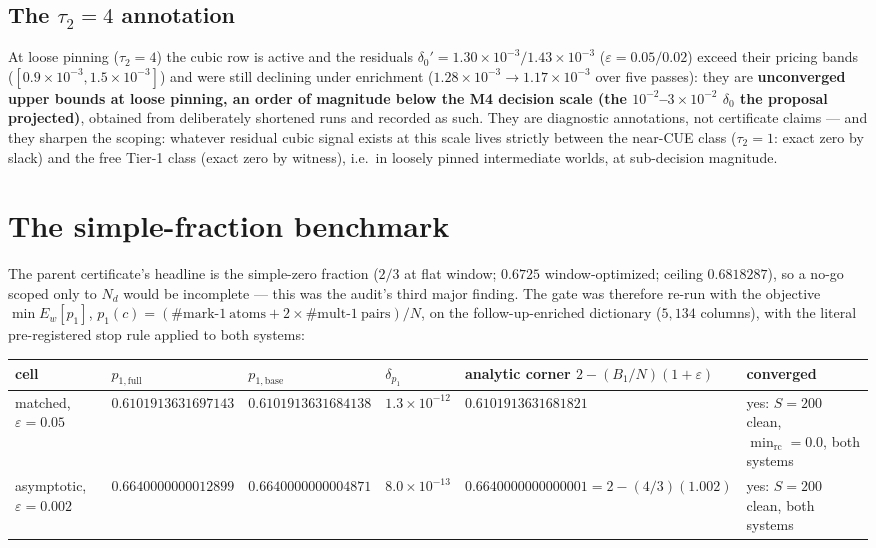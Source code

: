 \documentclass[11pt]{article}
\theoremstyle{plain}
\theoremstyle{definition}
\theoremstyle{remark}
\newcommand{\Nd}{N_{d}}
\begin{document}
\subsection[The tau\_2 = 4 annotation]{The $\tau_2 = 4$ annotation}

At loose pinning ($\tau_2 = 4$) the cubic row is active and the residuals
$\delta_0' = 1.30 \times 10^{-3} / 1.43 \times 10^{-3}$
($\varepsilon = 0.05 / 0.02$) exceed their pricing bands
($[0.9 \times 10^{-3}, 1.5 \times 10^{-3}]$) and were still declining under
enrichment ($1.28 \times 10^{-3} \to 1.17 \times 10^{-3}$ over five passes): they
are \textbf{unconverged upper bounds at loose pinning, an order of magnitude
below the M4 decision scale (the $10^{-2}$--$3 \times 10^{-2}$ $\delta_0$ the
proposal projected)}, obtained from deliberately shortened runs and recorded as
such. They are diagnostic annotations, not certificate claims --- and they
sharpen the scoping: whatever residual cubic signal exists at this scale lives
strictly between the near-CUE class ($\tau_2 = 1$: exact zero by slack) and the
free Tier-1 class (exact zero by witness), i.e.\ in loosely pinned intermediate
worlds, at sub-decision magnitude.

\section{The simple-fraction benchmark}
\label{sec:p1}

The parent certificate's headline is the simple-zero fraction ($2/3$ at flat
window; $0.6725$ window-optimized; ceiling $0.6818287$), so a no-go scoped only
to $\Nd$ would be incomplete --- this was the audit's third major finding. The
gate was therefore re-run with the objective $\min E_w[p_1]$,
$p_1(c) = (\#\text{mark-}1\ \mathrm{atoms}
 + 2 \times \#\text{mult-}1\ \mathrm{pairs})/N$, on the follow-up-enriched
dictionary ($5{,}134$ columns), with the literal pre-registered stop rule applied
to both systems:

\begin{table}[h]
\centering
\footnotesize
\begin{tabular}{@{}>{\raggedright\arraybackslash}p{1.7cm}
                  >{\raggedright\arraybackslash}p{2.9cm}
                  >{\raggedright\arraybackslash}p{2.9cm}
                  >{\raggedright\arraybackslash}p{1.4cm}
                  >{\raggedright\arraybackslash}p{3.2cm}
                  >{\raggedright\arraybackslash}p{2.2cm}@{}}
\toprule
cell & $p_{1,\mathrm{full}}$ & $p_{1,\mathrm{base}}$ & $\delta_{p_1}$ &
analytic corner $2 - (B_1/N)(1 + \varepsilon)$ & converged \\
\midrule
matched, $\varepsilon = 0.05$ & $0.6101913631697143$ &
$0.6101913631684138$ & $1.3 \times 10^{-12}$ & $0.6101913631681821$ &
yes: $S = 200$ clean, $\min_{\mathrm{rc}} = 0.0$, both systems \\
\addlinespace
asymptotic, $\varepsilon = 0.002$ & $0.6640000000012899$ &
$0.6640000000004871$ & $8.0 \times 10^{-13}$ &
$0.6640000000000001 = 2 - (4/3)(1.002)$ &
yes: $S = 200$ clean, both systems \\
\bottomrule
\end{tabular}
\end{table}
\end{document}
